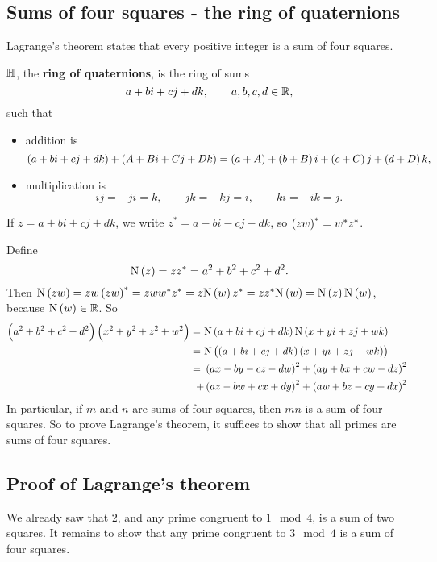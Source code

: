 \subsection{Sums of four squares - the ring of quaternions}

Lagrange's theorem states that every positive integer is a sum of four squares.

\begin{definition}
$ \mathbb{H} $, the \textbf{ring of quaternions}, is the ring of sums
$$ a + bi + cj + dk, \qquad a, b, c, d \in \mathbb{R}, $$
such that
\begin{itemize}
\item addition is
$$ \br{a + bi + cj + dk} + \br{A + Bi + Cj + Dk} = \br{a + A} + \br{b + B}i + \br{c + C}j + \br{d + D}k, $$
\item multiplication is
$$ ij = -ji = k, \qquad jk = -kj = i, \qquad ki = -ik = j. $$
\end{itemize}
If $ z = a + bi + cj + dk $, we write $ z^* = a - bi - cj - dk $, so $ \br{zw}^* = w^*z^* $.
\end{definition}

Define
$$ \N\br{z} = zz^* = a^2 + b^2 + c^2 + d^2. $$
Then $ \N\br{zw} = zw\br{zw}^* = zww^*z^* = z\N\br{w}z^* = zz^*\N\br{w} = \N\br{z}\N\br{w} $, because $ \N\br{w} \in \RR $. So
\begin{align*}
\br{a^2 + b^2 + c^2 + d^2}\br{x^2 + y^2 + z^2 + w^2}
= \ & \N\br{a + bi + cj + dk}\N\br{x + yi + zj + wk} \\
= \ & \N\br{\br{a + bi + cj + dk}\br{x + yi + zj + wk}} \\
= \ & \br{ax - by - cz - dw}^2 + \br{ay + bx + cw - dz}^2 \\
+ & \br{az - bw + cx + dy}^2 + \br{aw + bz - cy + dx}^2.
\end{align*}
In particular, if $ m $ and $ n $ are sums of four squares, then $ mn $ is a sum of four squares. So to prove Lagrange's theorem, it suffices to show that all primes are sums of four squares.

\pagebreak

\subsection{Proof of Lagrange's theorem}

We already saw that $ 2 $, and any prime congruent to $ 1 \mod 4 $, is a sum of two squares. It remains to show that any prime congruent to $ 3 \mod 4 $ is a sum of four squares.

